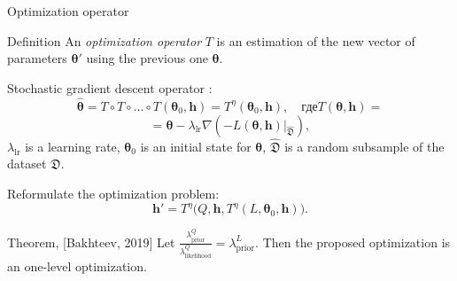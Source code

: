 \documentclass[usenames,dvipsnames,11pt,pdf,utf8,russian,aspectratio=43]{beamer}
\begin{document}
\begin{frame}{Optimization operator}
\small
\begin{block}{Definition}
An \textit{optimization operator}  $T$ is an estimation of the new vector of parameters $\boldsymbol{\theta}'$  using the previous one $\boldsymbol{\theta}$.
\end{block}
Stochastic gradient descent operator
:\[
	 \hat{\boldsymbol{\theta}} = T \circ T \circ \dots \circ T(\boldsymbol{\theta}_0, \mathbf{h}) = T^\eta(\boldsymbol{\theta}_0, \mathbf{h}), \quad\text{где}	T(\boldsymbol{\theta}, \mathbf{h}) =
\]
\[=\boldsymbol{\theta} - \lambda_\text{lr} \nabla \left(-L(\boldsymbol{\theta}, \mathbf{h})|_{\hat{\mathfrak{D}}}\right), 
\]
$\lambda_{\text{lr}}$ is a learning rate, $\boldsymbol{\theta}_0$ is an initial state for  $\boldsymbol{\theta}$, $\hat{\mathfrak{D}}$ is a random subsample of the dataset $\mathfrak{D}$.


Reformulate the optimization problem:
\[
	 \mathbf{h}' = T^\eta\bigl(Q, \mathbf{h}, T^\eta(L, \boldsymbol{\theta}_0, \mathbf{h})\bigr).
\]


\begin{block}{Theorem, [Bakhteev, 2019]}
Let $\frac{\lambda^Q_\text{prior}}{\lambda^Q_\text{likelihood}} = {\lambda^L_\text{prior}}.$ Then the proposed optimization is an one-level optimization.
\end{block}

\end{frame}
\end{document}
